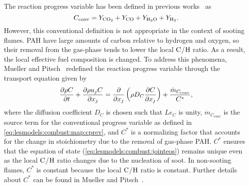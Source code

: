 The reaction progress variable has been defined in previous works~\cite{pierce2004,ihme2008} as
\begin{equation}\label{eq:lesmodels:combust:map:cprev}
  C_{\text{conv}} = Y_{\ce{CO2}} + Y_{\ce{CO}} + Y_{\ce{H2O}} + Y_{\ce{H2}}.
\end{equation}
However, this conventional definition is not appropriate in the context of sooting flames. PAH have large amounts of carbon relative to hydrogen and oxygen, so their removal from the gas-phase tends to lower the local $\ce{C}$/$\ce{H}$ ratio. As a result, the local effective fuel composition is changed. To address this phenomena, Mueller and Pitsch~\cite{mueller2012} redefined the reaction progress variable through the transport equation given by
\begin{equation}\label{eq:lesmodels:combust:map:c}
  \trder{C} = \pder[]{x_j}\left( \rho D_C \pder[C]{x_j} \right) + \frac{\dot{m}_{C_{\text{conv}}}}{C^*},
\end{equation}
where the diffusion coefficient $D_C$ is chosen such that $Le_C$ is unity, $\dot{m}_{C_{\text{conv}}}$ is the source term for the conventional progress variable as defined in \cref{eq:lesmodels:combust:map:cprev}, and $C^*$ is a normalizing factor that accounts for the change in stoichiometry due to the removal of gas-phase PAH. $C^*$ ensures that the equation of state (\cref{eq:lesmodels:combust:jointeos}) remains unique even as the local $\ce{C}$/$\ce{H}$ ratio changes due to the nucleation of soot. In non-sooting flames, $C^*$ is constant because the local $\ce{C}$/$\ce{H}$ ratio is constant. Further details about $C^*$ can be found in Mueller and Pitsch~\cite{mueller2012}.


